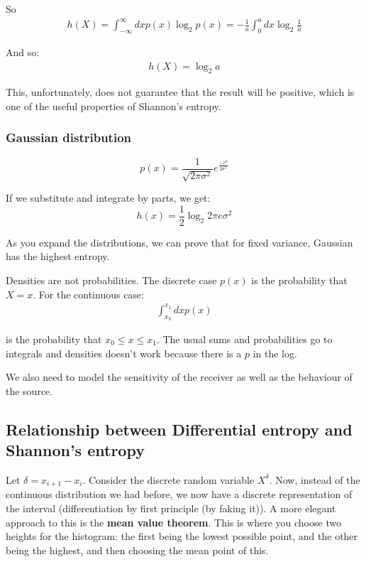 \documentclass[11pt,a4paper,titlepage,dvipsnames,cmyk]{scrartcl}
\begin{document}
So
\begin{align*}
h(X) = \int_{-\infty}^{\infty} dx p(x) \log_2 p(x) = - \frac{1}{a}\int_{0}^{a}dx \log_2 \frac{1}{a}
\end{align*}

And so:
\begin{align*}
h(X) = \log_2 a
\end{align*}

This, unfortunately, does not guarantee that the result will be positive, which is one of the useful properties of Shannon's entropy.

\subsubsection{Gaussian distribution}
$$p(x) = \frac{1}{\sqrt{2 \pi \sigma^2}}e^{\frac{-x^2}{2\sigma^2}}$$

If we substitute and integrate by parts, we get:
$$h(x) = \frac{1}{2} \log_2 2 \pi e \sigma ^2$$

As you expand the distributions, we can prove that for fixed variance, Gaussian has the highest entropy.

Densities are not probabilities. The discrete case $p(x)$ is the probability that $X = x$. For the continuous case:
\begin{align*}
\int_{x_0}^{x_1} dx p(x)
\end{align*}

is the probability that $x_0 \le x \le x_1$. The usual sums and probabilities go to integrals and densities doesn't work because there is a $p$ in the log.

We also need to model the sensitivity of the receiver as well as the behaviour of the source.

\subsection{Relationship between Differential entropy and Shannon's entropy}
Let $\delta = x_{i+1} - x_i$. Consider the discrete random variable $X^\delta$. Now, instead of the continuous distribution we had before, we now have a discrete representation of the interval (differentiation by first principle (by faking it)). A more elegant approach to this is the \textbf{mean value theorem}. This is where you choose two heights for the histogram: the first being the lowest possible point, and the other being the highest, and then choosing the mean point of this.
\end{document}
